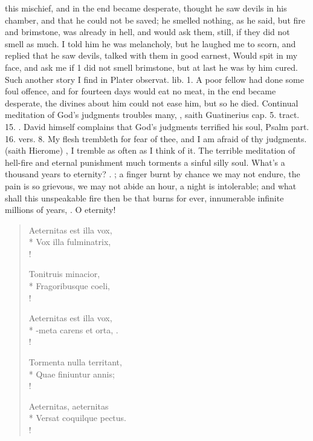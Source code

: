 {this mischief, and in the end became desperate, thought he saw devils
in his chamber, and that he could not be saved; he smelled nothing, as
he said, but fire and brimstone, was already in hell, and would ask
them, still, if they did not smell as much. I told him he was
melancholy, but he laughed me to scorn, and replied that he saw devils,
talked with them in good earnest, Would spit in my face, and ask me if
1 did not smell brimstone, but at last he was by him cured. Such
another story I find in Plater \textlatin{observat. lib. 1.} A poor fellow had done
some foul offence, and for fourteen days would eat no meat, in the end
became desperate, the divines about him could not ease him, but
so he died. Continual meditation of God's judgments troubles many,
, saith Guatinerius \textlatin{cap. 5. tract. 15.}
. David himself complains that God's
judgments terrified his soul, Psalm  part. 16. vers. 8. My flesh
trembleth for fear of thee, and I am afraid of thy judgments.  (saith Hierome) , I
tremble as often as I think of it. The terrible meditation of hell-fire
and eternal punishment much torments a sinful silly soul. What's a
thousand years to eternity? . ; a finger burnt by chance
we may not endure, the pain is so grievous, we may not abide an hour, a
night is intolerable; and what shall this unspeakable fire then be that
burns for ever, innumerable infinite millions of years, . O eternity!

\begin{latin}
\begin{verse}
Aeternitas est illa vox,\\*
Vox illa fulminatrix,\\!

Tonitruis minacior,\\*
Fragoribusque coeli,\\!

Aeternitas est illa vox,\\*
-meta carens et orta, \etc{}.\\!

Tormenta nulla territant,\\*
Quae finiuntur annis;\\!

Aeternitas, aeternitas\\*
Versat coquilque pectus.\\!


\end{verse}
\end{latin}}
